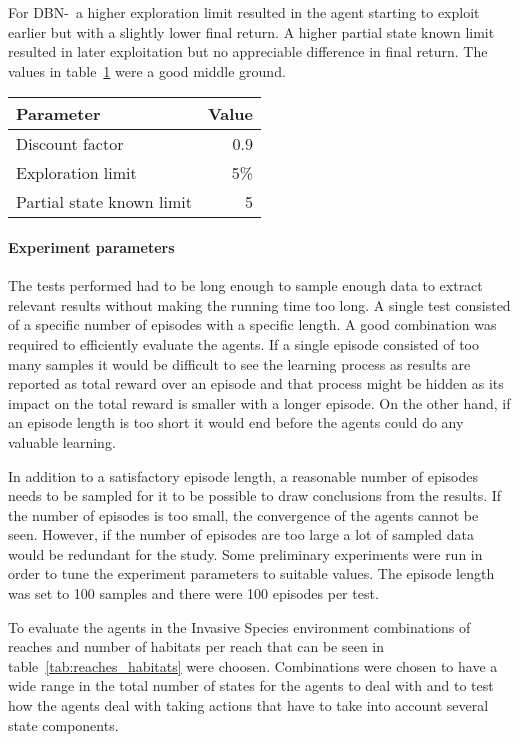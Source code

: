 For DBN-\etre\ a higher exploration limit resulted in the agent starting to
exploit earlier but with a slightly lower final return. A higher partial state
known limit resulted in later exploitation but no appreciable difference in
final return. The values in table~\ref{tab:dbne3_params} were a good middle
ground.

\begin{table}[H]
\label{tab:dbne3_params}
\centering
\begin{tabular}{lr}
 \toprule
 Parameter & Value \\
 \midrule
 Discount factor & 0.9 \\
 Exploration limit & 5\% \\
 Partial state known limit & 5 \\
 \bottomrule
\end{tabular}
\end{table}

\paragraph{Experiment parameters}

The tests performed had to be long enough to sample enough data to extract
relevant results without making the running time too long. A single test
consisted of a specific number of episodes with a specific length. A good
combination was required to efficiently evaluate the agents. If a single
episode consisted of too many samples it would be difficult to see the learning
process as results are reported as total reward over an episode and that
process might be hidden as its impact on the total reward is smaller with a
longer episode. On the other hand, if an episode length is too short it would
end before the agents could do any valuable learning.

In addition to a satisfactory episode length, a reasonable number of episodes
needs to be sampled for it to be possible to draw conclusions from the results.
If the number of episodes is too small, the convergence of the agents cannot be
seen. However, if the number of episodes are too large a lot of sampled data
would be redundant for the study. Some preliminary experiments were run in
order to tune the experiment parameters to suitable values. The episode length
was set to 100 samples and there were 100 episodes per test.

To evaluate the agents in the Invasive Species environment combinations of
reaches and number of habitats per reach that can be seen in
table~\ref{tab:reaches_habitats} were choosen. Combinations were chosen to have
a wide range in the total number of states for the agents to deal with and to
test how the agents deal with taking actions that have to take into account
several state components.

